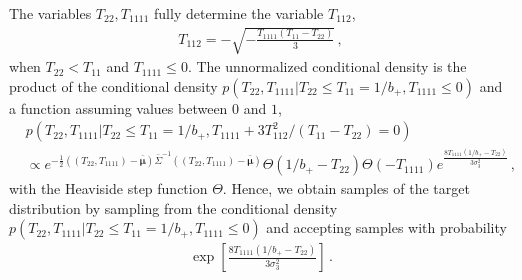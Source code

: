 \documentclass[a4paper, 11pt]{article}
\begin{document}
\noindent The variables $T_{22},T_{1111}$ fully determine the variable $T_{112}$,
\begin{align}
T_{112}= -\sqrt{-\frac{T_{1111}(T_{11}-T_{22})}{3}}\,,
\end{align}
when $T_{22} < T_{11}$ and $T_{1111}\leq 0$.  The unnormalized conditional density is the product of the conditional density $p(T_{22},T_{1111}|T_{22}\leq T_{11}=1/b_+,T_{1111}\leq 0)$ and a function assuming values between $0$ and $1$,
\begin{align}
&p(T_{22},T_{1111}|T_{22}\leq T_{11}=1/b_+, T_{1111}+3T_{112}^2/(T_{11}-T_{22}) =0)\nonumber\\
& \propto e^{-\frac{1}{2}((T_{22},T_{1111})-\bar{\bm{\mu}})\bar{\Sigma}^{-1}((T_{22},T_{1111})-\bar{\bm{\mu}}) }\Theta(1/b_+-T_{22})\Theta(-T_{1111})e^{ \frac{8T_{1111} (1/b_+ - T_{22})}{3 \sigma_3^2}}\,,
\end{align}
with the Heaviside step function $\Theta$. Hence, we obtain samples of the target distribution by sampling from the conditional density $p(T_{22},T_{1111}|T_{22}\leq T_{11}=1/b_+,T_{1111}\leq 0)$ and accepting samples with probability 
\begin{align}
\exp\left[ \frac{8T_{1111} (1/b_+ - T_{22})}{3 \sigma_3^2}\right]\,.
\end{align}
\end{document}
